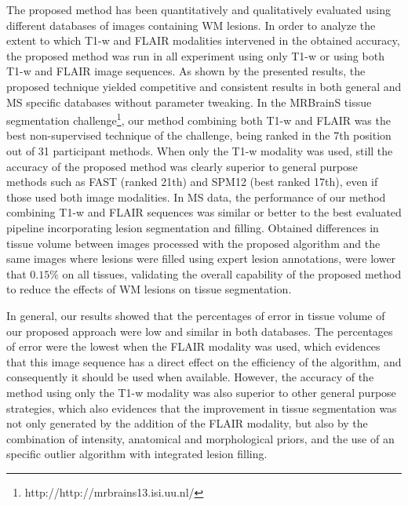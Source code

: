 The proposed method has been quantitatively and qualitatively evaluated using different databases of images containing WM lesions. In order to analyze the extent to which T1-w and FLAIR modalities intervened in the obtained accuracy, the proposed method was run in all experiment using only T1-w or using both T1-w and FLAIR image sequences. As shown by the presented results, the proposed technique yielded competitive and consistent results in both general and MS specific databases without parameter tweaking. In the MRBrainS tissue segmentation challenge\footnote{http://http://mrbrains13.isi.uu.nl/}, our method combining both T1-w and FLAIR was the best non-supervised technique of the challenge, being ranked in the 7th position out of 31 participant methods. When only the T1-w modality was used, still the accuracy of the proposed method was clearly superior to general purpose methods such as FAST (ranked 21th) and SPM12 (best ranked 17th), even if those used both image modalities. In MS data, the performance of our method combining T1-w and FLAIR sequences was similar or better to the best evaluated pipeline incorporating lesion segmentation and filling. Obtained differences in tissue volume between images processed with the proposed algorithm and the same images where lesions were filled using expert lesion annotations, were lower that $0.15\%$ on all tissues, validating the overall capability of the proposed method to reduce the effects of WM lesions on tissue segmentation. 

In general, our results showed that the percentages of error in tissue volume of our proposed approach were low and similar in both databases. The percentages of error were the lowest when the FLAIR modality was used, which evidences that this image sequence has a direct effect on the efficiency of the algorithm, and consequently it should be used when available. However, the accuracy of the method using only the T1-w modality was also superior to other general purpose strategies, which also evidences that the improvement in tissue segmentation was not only generated by the addition of the FLAIR modality, but also by the combination of intensity, anatomical and morphological priors, and the use of an specific outlier algorithm with integrated lesion filling.


